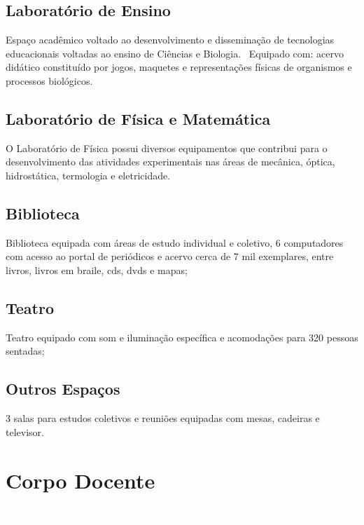 \documentclass[11pt,fleqn]{book} %
\begin{document}
\section{Laboratório de Ensino}
Espaço acadêmico voltado ao desenvolvimento e disseminação de tecnologias educacionais voltadas ao ensino de Ciências e Biologia.  Equipado com: acervo didático constituído por jogos, maquetes e representações físicas de organismos e processos biológicos.

\section{Laboratório de Física e Matemática}
O Laboratório de Física possui diversos equipamentos que contribui para o desenvolvimento das atividades experimentais nas áreas de mecânica, óptica, hidrostática, termologia e eletricidade.

\section{Biblioteca}
Biblioteca equipada com áreas de estudo individual e coletivo, 6 computadores com acesso ao portal de periódicos e acervo cerca de 7 mil exemplares, entre livros, livros em braile, cds, dvds e mapas;

\section{Teatro}
Teatro equipado com som e iluminação específica e acomodações para 320 pessoas sentadas;

\section{Outros Espaços}
3 salas para estudos coletivos e reuniões equipadas com mesas, cadeiras e televisor.


\chapter{Corpo Docente}\label{docentes}
\vspace{6em}
\begin{flushright}
	\textit{\textcolor{white}{Um bonita citação...}}
\end{flushright}
\vspace{12em}
\end{document}
